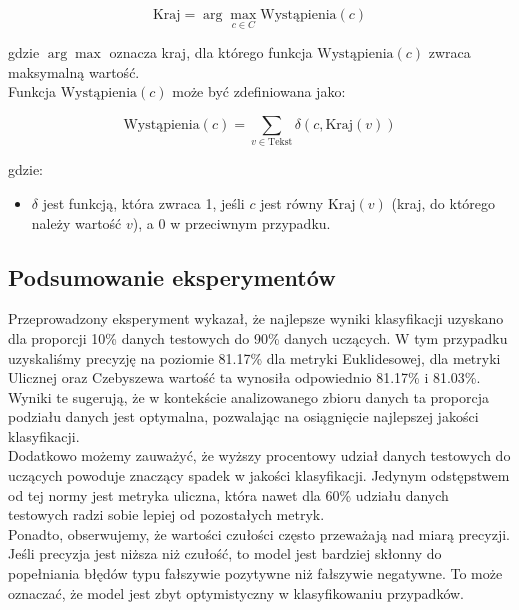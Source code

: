 \documentclass{article}
\begin{document}
\begin{equation}
\text{Kraj} = \arg\max_{c \in C} \text{Wystąpienia}(c)
\end{equation}

gdzie $\arg\max$ oznacza kraj, dla którego funkcja $\text{Wystąpienia}(c)$ zwraca maksymalną wartość. \\

Funkcja $\text{Wystąpienia}(c)$ może być zdefiniowana jako:

\begin{equation}
\text{Wystąpienia}(c) = \sum_{v \in \text{Tekst}} \delta(c, \text{Kraj}(v))
\end{equation}

gdzie:
\begin{itemize}
    \item $\delta$ jest funkcją, która zwraca 1, jeśli $c$ jest równy $\text{Kraj}(v)$ (kraj, do którego należy wartość $v$), a 0 w przeciwnym przypadku.
\end{itemize}

\subsection*{Podsumowanie eksperymentów}

\noindent Przeprowadzony eksperyment wykazał, że najlepsze wyniki klasyfikacji uzyskano dla proporcji 10\% danych testowych do 90\% danych uczących. W tym przypadku uzyskaliśmy precyzję na poziomie 81.17\% dla metryki Euklidesowej, dla metryki Ulicznej oraz Czebyszewa wartość ta wynosiła odpowiednio 81.17\% i 81.03\%. Wyniki te sugerują, że w kontekście analizowanego zbioru danych ta proporcja podziału danych jest optymalna, pozwalając na osiągnięcie najlepszej jakości klasyfikacji. \\

\noindent Dodatkowo możemy zauważyć, że wyższy procentowy udział danych testowych do uczących powoduje znaczący spadek w jakości klasyfikacji. Jedynym odstępstwem od tej normy jest metryka uliczna, która nawet dla 60\% udziału danych testowych radzi sobie lepiej od pozostałych metryk. \\

\noindent Ponadto, obserwujemy, że wartości czułości często przeważają nad miarą precyzji. Jeśli precyzja jest niższa niż czułość, to model jest bardziej skłonny do popełniania błędów typu fałszywie pozytywne niż fałszywie negatywne. To może oznaczać, że model jest zbyt optymistyczny w klasyfikowaniu przypadków. \\
\end{document}
